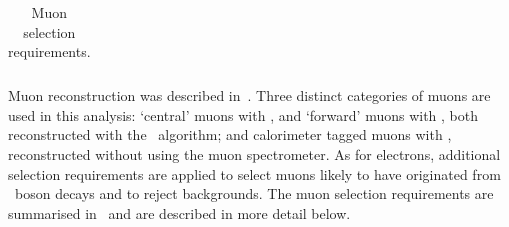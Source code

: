 \begin{table}[]
\begin{tabular}{ l  l l }
%
    \hline \hline
  \end{tabular}
   \caption{Muon selection requirements.}
   \label{table:objsel-mu}
\end{table}

Muon reconstruction was described in~. Three distinct categories of
muons are used in this analysis: `central' muons with , and
`forward' muons with , both reconstructed with the
\staco\ algorithm; and calorimeter tagged muons with ,
reconstructed without using the muon spectrometer. As for electrons, additional
selection requirements are applied to select muons likely to have originated from
\Z\ boson decays and to reject backgrounds. The muon selection requirements are
summarised in~ and are described in more detail below. 

